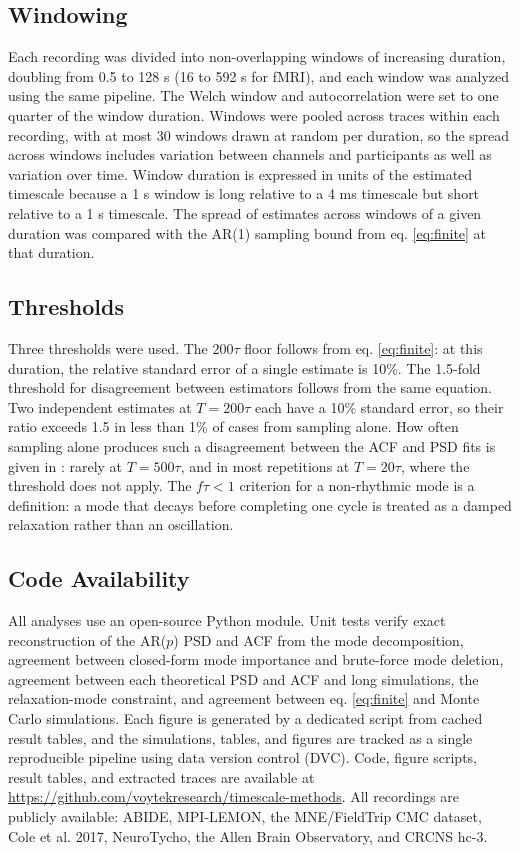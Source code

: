\documentclass[pdflatex,sn-mathphys-num]{sn-jnl}
\begin{document}
\subsection{Windowing}

Each recording was divided into non-overlapping windows of increasing duration, doubling from 0.5 to 128 s (16 to 592 s for fMRI), and each window was analyzed using the same pipeline. The Welch window and autocorrelation were set to one quarter of the window duration. Windows were pooled across traces within each recording, with at most 30 windows drawn at random per duration, so the spread across windows includes variation between channels and participants as well as variation over time. Window duration is expressed in units of the estimated timescale because a 1 s window is long relative to a 4 ms timescale but short relative to a 1 s timescale. The spread of estimates across windows of a given duration was compared with the AR(1) sampling bound from eq. \ref{eq:finite} at that duration.

\subsection{Thresholds}

Three thresholds were used. The $200\tau$ floor follows from eq. \ref{eq:finite}: at this duration, the relative standard error of a single estimate is 10\%. The 1.5-fold threshold for disagreement between estimators follows from the same equation. Two independent estimates at $T = 200\tau$ each have a 10\% standard error, so their ratio exceeds 1.5 in less than 1\% of cases from sampling alone. How often sampling alone produces such a disagreement between the ACF and PSD fits is given in : rarely at $T = 500\tau$, and in most repetitions at $T = 20\tau$, where the threshold does not apply. The $f\tau < 1$ criterion for a non-rhythmic mode is a definition: a mode that decays before completing one cycle is treated as a damped relaxation rather than an oscillation.

\subsection{Code Availability}

All analyses use an open-source Python module. Unit tests verify exact reconstruction of the AR($p$) PSD and ACF from the mode decomposition, agreement between closed-form mode importance and brute-force mode deletion, agreement between each theoretical PSD and ACF and long simulations, the relaxation-mode constraint, and agreement between eq. \ref{eq:finite} and Monte Carlo simulations. Each figure is generated by a dedicated script from cached result tables, and the simulations, tables, and figures are tracked as a single reproducible pipeline using data version control (DVC). Code, figure scripts, result tables, and extracted traces are available at \href{https://github.com/voytekresearch/timescale-methods}{https://github.com/voytekresearch/timescale-methods}. All recordings are publicly available: ABIDE, MPI-LEMON, the MNE/FieldTrip CMC dataset, Cole et al. 2017, NeuroTycho, the Allen Brain Observatory, and CRCNS hc-3.
\end{document}
